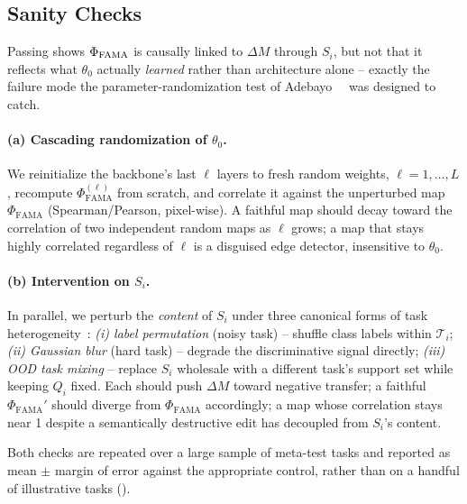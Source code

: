 \subsection{Sanity Checks}
\label{sec:sanity}

Passing \biadt shows $\Phi_{\mathrm{FAMA}}$ is causally linked to $\Delta M$ through $S_i$, but not that it reflects what $\theta_0$ actually \emph{learned} rather than architecture alone -- exactly the failure mode the parameter-randomization test of Adebayo~\etal~\cite{adebayo2018sanity} was designed to catch.

\paragraph{(a) Cascading randomization of $\theta_0$.} We reinitialize the backbone's last $\ell$ layers to fresh random weights, $\ell=1,\dots,L$, recompute $\Phi_{\mathrm{FAMA}}^{(\ell)}$ from scratch, and correlate it against the unperturbed map $\Phi_{\mathrm{FAMA}}$ (Spearman/Pearson, pixel-wise). A faithful map should decay toward the correlation of two independent random maps as $\ell$ grows; a map that stays highly correlated regardless of $\ell$ is a disguised edge detector, insensitive to $\theta_0$.

\paragraph{(b) Intervention on $S_i$.} In parallel, we perturb the \emph{content} of $S_i$ under three canonical forms of task heterogeneity~\cite{si2025meta}: \emph{(i) label permutation} (noisy task) -- shuffle class labels within $\mathcal{T}_i$; \emph{(ii) Gaussian blur} (hard task) -- degrade the discriminative signal directly; \emph{(iii) OOD task mixing} -- replace $S_i$ wholesale with a different task's support set while keeping $Q_i$ fixed. Each should push $\Delta M$ toward negative transfer; a faithful $\Phi_{\mathrm{FAMA}}'$ should diverge from $\Phi_{\mathrm{FAMA}}$ accordingly; a map whose correlation stays near 1 despite a semantically destructive edit has decoupled from $S_i$'s content.

Both checks are repeated over a large sample of meta-test tasks and reported as mean $\pm$ margin of error against the appropriate control, rather than on a handful of illustrative tasks ().
